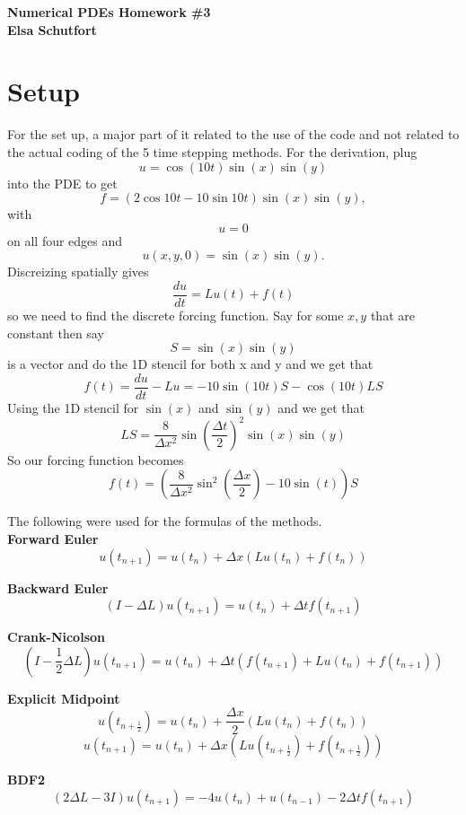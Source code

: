 \documentclass[12pt,answers]{exam}
\begin{document}
\begin{center}
\textbf{Numerical PDEs Homework \#3}\\
\textbf{Elsa Schutfort}
\end{center}

\section{Setup}
For the set up, a major part of it related to the use of the code and not related to the actual coding of the 5 time stepping methods. For the derivation, plug $$u = \cos (10t) \sin (x) \sin (y)$$ into the PDE to get $$f = (2 \cos 10t - 10 \sin 10t) \sin (x) \sin (y),$$ with $$u = 0$$ on all four edges and $$u(x, y, 0) = \sin (x) \sin (y).$$ Discreizing spatially gives 
$$\frac{du}{dt} = Lu(t) + f(t)$$
so we need to find the discrete forcing function. Say for some $x, y$ that are constant then say $$S = \sin (x)\sin (y)$$ is a vector and do the 1D stencil for both x and y and we get that 
$$f(t) = \frac{du}{dt} - L u = -10 \sin(10t) S - \cos (10t) L S$$
Using the 1D stencil for $\sin (x)$ and $\sin (y)$ and we get that 
$$LS = \frac{8}{\Delta x^2} \sin \left ( \frac{\Delta t}{2} \right )^2 \sin (x)\sin (y)$$
So our forcing function becomes
$$f(t) = \left (\frac{8}{\Delta x^2} \sin^2 \left ( \frac{\Delta x}{2} \right ) - 10 \sin (t) \right )S$$ 

The following were used for the formulas of the methods. \\
\textbf{Forward Euler}
$$u(t_{n+1}) = u(t_n)  + \Delta x (L u(t_n) + f(t_{n}))$$

\textbf{Backward Euler}
$$(I - \Delta L)u(t_{n+1}) = u(t_n) + \Delta t f(t_{n+1})$$

\textbf{Crank-Nicolson}
$$(I - \frac{1}{2} \Delta L)u(t_{n+1}) = u(t_n) + \Delta t (f(t_{n+1}) + Lu(t_n) + f(t_{n+1}))$$

\textbf{Explicit Midpoint}
$$u(t_{n+\frac{1}{2}}) = u(t_n)  + \frac{\Delta x}{2} (L u(t_n) + f(t_{n}))$$
$$u(t_{n+1}) = u(t_n)  + \Delta x (L u(t_{n+\frac{1}{2}}) + f(t_{n+\frac{1}{2}}))$$

\textbf{BDF2}
$$(2 \Delta L - 3I)u(t_{n+1}) = -4 u(t_n) + u(t_{n-1}) - 2 \Delta t f(t_{n+1})$$
\end{document}

